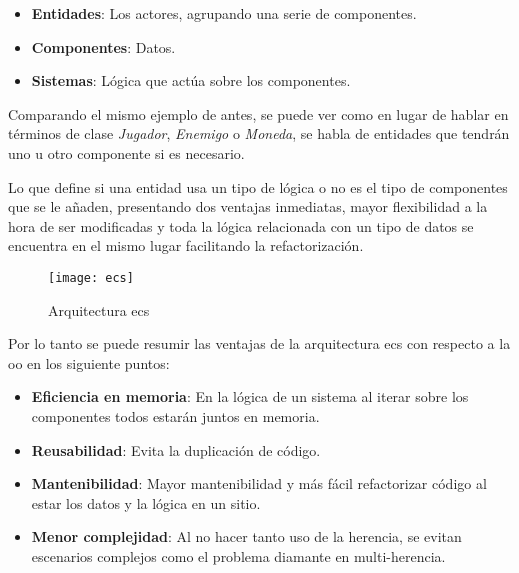 \begin{itemize} 
	\item \textbf{Entidades}: Los actores, agrupando una serie de componentes. 
	\item \textbf{Componentes}: Datos.
	\item \textbf{Sistemas}: Lógica que actúa sobre los componentes.
\end{itemize}
Comparando el mismo ejemplo de antes, se puede ver como en lugar de hablar en términos de clase \textit{Jugador}, 
\textit{Enemigo} o \textit{Moneda}, se habla de entidades que tendrán uno u otro componente si es necesario.

Lo que define si una entidad usa un tipo de lógica o no es el tipo de componentes que se le añaden, presentando dos
ventajas inmediatas, mayor flexibilidad a la hora de ser modificadas y toda la lógica relacionada con un tipo de datos
se encuentra en el mismo lugar facilitando la refactorización.

\begin{figure}[!h]
	\centering
	\texttt{[image: ecs]}
	\caption{Arquitectura \gls{ecs}}
	\label{ecs-figure}
\end{figure}

\newpage

Por lo tanto se puede resumir las ventajas de la arquitectura \gls{ecs} con respecto a la \gls{oo} en los siguiente puntos:

\begin{itemize} 
	\item \textbf{Eficiencia en memoria}: En la lógica de un sistema al iterar sobre los componentes todos estarán juntos en memoria\cite{memory-friendly}.
	\item \textbf{Reusabilidad}: Evita la duplicación de código.
	\item \textbf{Mantenibilidad}: Mayor mantenibilidad y más fácil refactorizar código al estar los datos y la lógica en un sitio.
	\item \textbf{Menor complejidad}: Al no hacer tanto uso de la herencia, se evitan escenarios complejos como el problema
	 diamante en multi-herencia.
\end{itemize}
